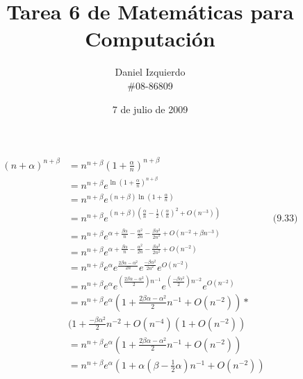 \documentclass{article}
\begin{document}

\title{Tarea 6 de Matemáticas para Computación}
\author{Daniel Izquierdo \\ \#08-86809}
\date{7 de julio de 2009}

\maketitle

\section{}

\section{}

%
\begin{align*}
(n+\alpha)^{n+\beta} & = n^{n+\beta}(1+\frac{\alpha}{n})^{n+\beta} \\
                     & = n^{n+\beta} e^{\ln (1+\frac{\alpha}{n})^{n+\beta}}\\
                     & = n^{n+\beta} e^{(n+\beta)\ln (1+\frac{\alpha}{n})}\\
                     & = n^{n+\beta} e^{(n+\beta) (\frac{\alpha}{n}-\frac{1}{2}(\frac{\alpha}{n})^2+O(n^{-3}))} & \text{(9.33)} \\
                     & = n^{n+\beta} e^{\alpha+\frac{\beta\alpha}{n}-\frac{\alpha^2}{2n}-\frac{\beta\alpha^2}{2n^2}+O(n^{-2}+\beta n^{-3})} \\
                     & = n^{n+\beta} e^{\alpha+\frac{\beta\alpha}{n}-\frac{\alpha^2}{2n}-\frac{\beta\alpha^2}{2n^2}+O(n^{-2})} \\
                     & = n^{n+\beta} e^{\alpha}e^{\frac{2\beta\alpha-\alpha^2}{2n}}e^{\frac{-\beta\alpha^2}{2n^2}}e^{O(n^{-2})} \\
                     & = n^{n+\beta} e^{\alpha}e^{(\frac{2\beta\alpha-\alpha^2}{2})n^{-1}}e^{(\frac{-\beta\alpha^2}{2})n^{-2}}e^{O(n^{-2})} \\
                     & = n^{n+\beta}
                         e^{\alpha}
                         (1 + \frac{2\beta\alpha-\alpha^2}{2}n^{-1}+O(n^{-2}))* \\
                         & (1+\frac{-\beta\alpha^2}{2}n^{-2}+O(n^{-4})
                         (1+O(n^{-2})) \\
                     & = n^{n+\beta} e^{\alpha} (1 + \frac{2\beta\alpha-\alpha^2}{2}n^{-1}+O(n^{-2})) \\
                     & = n^{n+\beta} e^{\alpha} (1 + \alpha (\beta - \frac{1}{2}\alpha) n^{-1}+O(n^{-2})) \\
\end{align*}


\section{}
\end{document}

